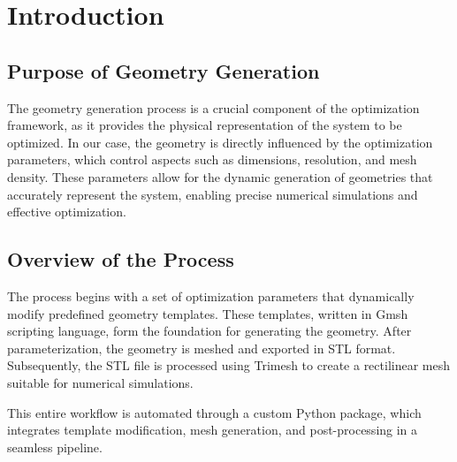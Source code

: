 \section{Introduction}

\subsection{Purpose of Geometry Generation}

The geometry generation process is a crucial component of the optimization framework, as it provides the physical representation of the system to be optimized. In our case, the geometry is directly influenced by the optimization parameters, which control aspects such as dimensions, resolution, and mesh density. These parameters allow for the dynamic generation of geometries that accurately represent the system, enabling precise numerical simulations and effective optimization.

\subsection{Overview of the Process}

The process begins with a set of optimization parameters that dynamically modify predefined geometry templates. These templates, written in Gmsh scripting language, form the foundation for generating the geometry. After parameterization, the geometry is meshed and exported in STL format. Subsequently, the STL file is processed using Trimesh to create a rectilinear mesh suitable for numerical simulations. 

This entire workflow is automated through a custom Python package, which integrates template modification, mesh generation, and post-processing in a seamless pipeline.


